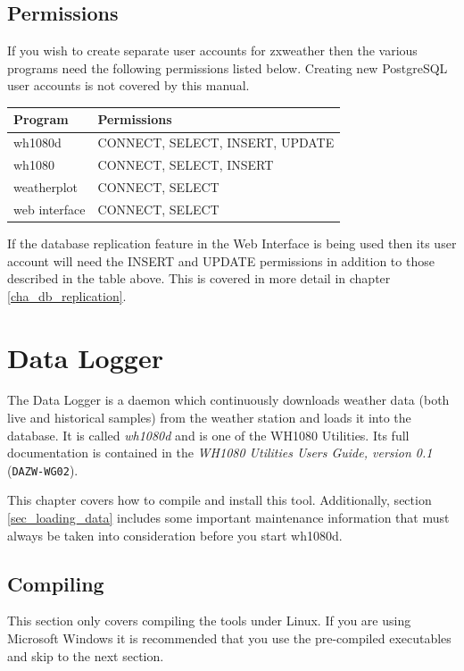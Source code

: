 \documentclass[a4paper,10pt,draft]{book}
\begin{document}
\section{Permissions}
If you wish to create separate user accounts for zxweather then the various programs need the following permissions listed below. Creating new PostgreSQL user accounts is not covered by this manual.

\begin{tabular}{l l}
\hline
\textbf{Program} & \textbf{Permissions} \\
\hline
wh1080d & CONNECT, SELECT, INSERT, UPDATE \\
wh1080 & CONNECT, SELECT, INSERT \\
weatherplot & CONNECT, SELECT \\
web interface & CONNECT, SELECT \\
\hline
\end{tabular}

If the database replication feature in the Web Interface is being used then its user account will need the INSERT and UPDATE permissions in addition to those described in the table above. This is covered in more detail in chapter \ref{cha_db_replication}.


\chapter{Data Logger}
\label{cha_data_logger}

The Data Logger is a daemon which continuously downloads weather data (both live and historical samples) from the weather station and loads it into the database. It is called \emph{wh1080d} and is one of the WH1080 Utilities. Its full documentation is contained in the \emph{WH1080 Utilities Users Guide, version 0.1} (\verb|DAZW-WG02|).

This chapter covers how to compile and install this tool. Additionally, section \ref{sec_loading_data} includes some important maintenance information that must always be taken into consideration before you start wh1080d.

\section{Compiling}
This section only covers compiling the tools under Linux. If you are using Microsoft Windows it is recommended that you use the pre-compiled executables and skip to the next section.
\end{document}
